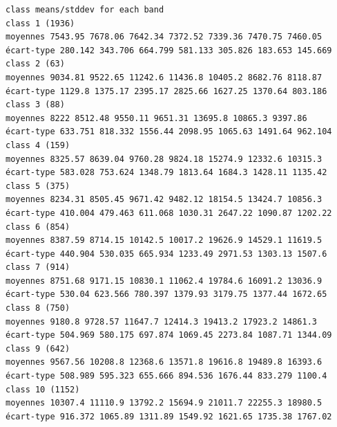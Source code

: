 \documentclass[land,article,submit,pdftex,moreauthors]{Definitions/mdpi}
\begin{document}
\begin{scriptsize}
\begin{verbatim}
class means/stddev for each band
class 1 (1936)
moyennes 7543.95 7678.06 7642.34 7372.52 7339.36 7470.75 7460.05
écart-type 280.142 343.706 664.799 581.133 305.826 183.653 145.669
class 2 (63)
moyennes 9034.81 9522.65 11242.6 11436.8 10405.2 8682.76 8118.87
écart-type 1129.8 1375.17 2395.17 2825.66 1627.25 1370.64 803.186
class 3 (88)
moyennes 8222 8512.48 9550.11 9651.31 13695.8 10865.3 9397.86
écart-type 633.751 818.332 1556.44 2098.95 1065.63 1491.64 962.104
class 4 (159)
moyennes 8325.57 8639.04 9760.28 9824.18 15274.9 12332.6 10315.3
écart-type 583.028 753.624 1348.79 1813.64 1684.3 1428.11 1135.42
class 5 (375)
moyennes 8234.31 8505.45 9671.42 9482.12 18154.5 13424.7 10856.3
écart-type 410.004 479.463 611.068 1030.31 2647.22 1090.87 1202.22
class 6 (854)
moyennes 8387.59 8714.15 10142.5 10017.2 19626.9 14529.1 11619.5
écart-type 440.904 530.035 665.934 1233.49 2971.53 1303.13 1507.6
class 7 (914)
moyennes 8751.68 9171.15 10830.1 11062.4 19784.6 16091.2 13036.9
écart-type 530.04 623.566 780.397 1379.93 3179.75 1377.44 1672.65
class 8 (750)
moyennes 9180.8 9728.57 11647.7 12414.3 19413.2 17923.2 14861.3
écart-type 504.969 580.175 697.874 1069.45 2273.84 1087.71 1344.09
class 9 (642)
moyennes 9567.56 10208.8 12368.6 13571.8 19616.8 19489.8 16393.6
écart-type 508.989 595.323 655.666 894.536 1676.44 833.279 1100.4
class 10 (1152)
moyennes 10307.4 11110.9 13792.2 15694.9 21011.7 22255.3 18980.5
écart-type 916.372 1065.89 1311.89 1549.92 1621.65 1735.38 1767.02


\end{verbatim}
\end{scriptsize}
\end{document}
